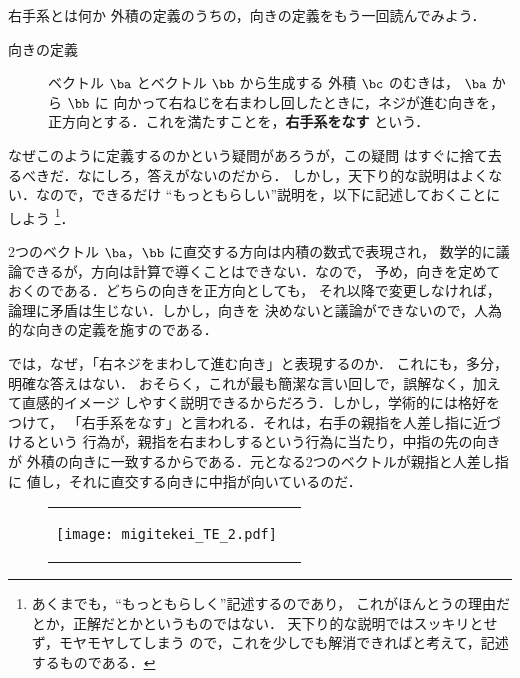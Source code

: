                 \begin{memo}{右手系とは何か}
                    外積の定義のうちの，向きの定義をもう一回読んでみよう．

                    \begin{description}
                        \item[向きの定義]
                            ベクトル $\ba$ とベクトル $\bb$ から生成する
                            外積 $\bc$ のむきは，
                            $\ba$ から $\bb$ に 向かって右ねじを右まわし回したときに，ネジが進む向きを，
                            正方向とする．これを満たすことを，\textbf{右手系をなす} という．
                    \end{description}


                    なぜこのように定義するのかという疑問があろうが，この疑問
                    はすぐに捨て去るべきだ．なにしろ，答えがないのだから．
                    しかし，天下り的な説明はよくない．なので，できるだけ
                    “もっともらしい”説明を，以下に記述しておくことにしよう
                        \footnote{
                            あくまでも，“もっともらしく”記述するのであり，
                            これがほんとうの理由だとか，正解だとかというものではない．
                            天下り的な説明ではスッキリとせず，モヤモヤしてしまう
                            ので，これを少しでも解消できればと考えて，記述
                            するものである．
                        }．

                    2つのベクトル $\ba$，$\bb$ に直交する方向は内積の数式で表現され，
                    数学的に議論できるが，方向は計算で導くことはできない．なので，
                    予め，向きを定めておくのである．どちらの向きを正方向としても，
                    それ以降で変更しなければ，論理に矛盾は生じない．しかし，向きを
                    決めないと議論ができないので，人為的な向きの定義を施すのである．

                    では，なぜ，「右ネジをまわして進む向き」と表現するのか．
                    これにも，多分，明確な答えはない．
                    おそらく，これが最も簡潔な言い回しで，誤解なく，加えて直感的イメージ
                    しやすく説明できるからだろう．しかし，学術的には格好をつけて，
                    「右手系をなす」と言われる．それは，右手の親指を人差し指に近づけるという
                    行為が，親指を右まわしするという行為に当たり，中指の先の向きが
                    外積の向きに一致するからである．元となる2つのベクトルが親指と人差し指に
                    値し，それに直交する向きに中指が向いているのだ．
                    \begin{figure}[hbt]
                        \begin{tabular}{cc}
                            \begin{minipage}{0.5\hsize}
                                \begin{center}
                                    \texttt{[image: migitekei\_TE\_2.pdf]}


\end{center}
\end{minipage}
\end{tabular}
\end{figure}
\end{memo}
